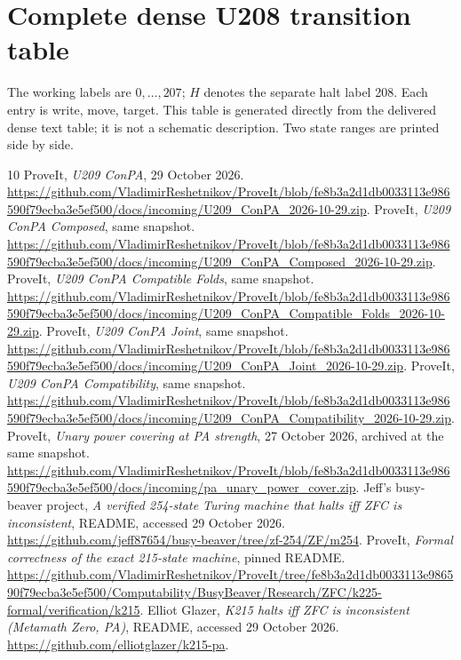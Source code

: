 \documentclass[11pt,letterpaper]{article}
\begin{document}
\clearpage
\section{Complete dense U208 transition table}\label{app:table}

The working labels are $0,\ldots,207$; $H$ denotes the separate halt label
208. Each entry is write, move, target. This table is generated directly
from the delivered dense text table; it is not a schematic description.
Two state ranges are printed side by side.


\begin{thebibliography}{10}\small
{} ProveIt, \emph{U209 ConPA}, 29 October 2026.
\url{https://github.com/VladimirReshetnikov/ProveIt/blob/fe8b3a2d1db0033113e986590f79ecba3e5ef500/docs/incoming/U209_ConPA_2026-10-29.zip}.
 ProveIt, \emph{U209 ConPA Composed}, same snapshot.
\url{https://github.com/VladimirReshetnikov/ProveIt/blob/fe8b3a2d1db0033113e986590f79ecba3e5ef500/docs/incoming/U209_ConPA_Composed_2026-10-29.zip}.
 ProveIt, \emph{U209 ConPA Compatible Folds}, same snapshot.
\url{https://github.com/VladimirReshetnikov/ProveIt/blob/fe8b3a2d1db0033113e986590f79ecba3e5ef500/docs/incoming/U209_ConPA_Compatible_Folds_2026-10-29.zip}.
 ProveIt, \emph{U209 ConPA Joint}, same snapshot.
\url{https://github.com/VladimirReshetnikov/ProveIt/blob/fe8b3a2d1db0033113e986590f79ecba3e5ef500/docs/incoming/U209_ConPA_Joint_2026-10-29.zip}.
 ProveIt, \emph{U209 ConPA Compatibility}, same snapshot.
\url{https://github.com/VladimirReshetnikov/ProveIt/blob/fe8b3a2d1db0033113e986590f79ecba3e5ef500/docs/incoming/U209_ConPA_Compatibility_2026-10-29.zip}.
 ProveIt, \emph{Unary power covering at PA strength},
27 October 2026, archived at the same snapshot.
\url{https://github.com/VladimirReshetnikov/ProveIt/blob/fe8b3a2d1db0033113e986590f79ecba3e5ef500/docs/incoming/pa_unary_power_cover.zip}.
 Jeff's busy-beaver project, \emph{A verified 254-state
Turing machine that halts iff ZFC is inconsistent}, README, accessed
29 October 2026.
\url{https://github.com/jeff87654/busy-beaver/tree/zf-254/ZF/m254}.
 ProveIt, \emph{Formal correctness of the exact 215-state
machine}, pinned README.
\url{https://github.com/VladimirReshetnikov/ProveIt/tree/fe8b3a2d1db0033113e986590f79ecba3e5ef500/Computability/BusyBeaver/Research/ZFC/k225-formal/verification/k215}.
 Elliot Glazer, \emph{K215 halts iff ZFC is inconsistent
(Metamath Zero, PA)}, README, accessed 29 October 2026.
\url{https://github.com/elliotglazer/k215-pa}.
\end{thebibliography}
\end{document}
